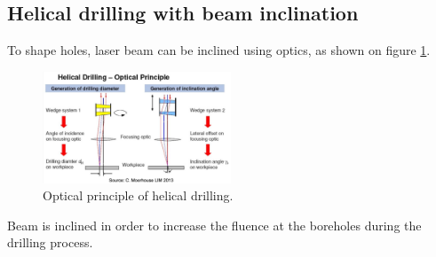 \subsection{Helical drilling with beam inclination}
To shape holes, laser beam can be inclined using optics, as shown on figure \ref{fig:inclin}. 

\begin{figure}[h!]
    \centering
    \includegraphics[width=0.5\textwidth]{slike/oinclination.png}
    \caption{Optical principle of helical drilling. \sln}
    \label{fig:inclin}
\end{figure}

Beam is inclined in order to increase the fluence at the boreholes during the drilling process.